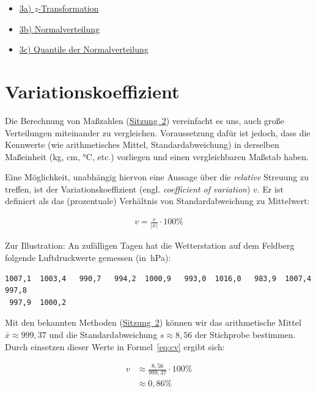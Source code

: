 \documentclass[
  11pt,
  ngerman,
  a4paper,
]{report}
\providecommand{\tightlist}{%
  \setlength{\itemsep}{0pt}\setlength{\parskip}{0pt}}
\begin{document}
\begin{itemize}
\tightlist
\item
  \href{https://video01.uni-frankfurt.de/Mediasite/Play/8c755eed883b4ea0924481da818b742f1d}{3a) \(z\)-Transformation}
\item
  \href{https://video01.uni-frankfurt.de/Mediasite/Play/26e839cc0d8d43d2a74c2c03b76aa6421d}{3b) Normalverteilung}
\item
  \href{https://video01.uni-frankfurt.de/Mediasite/Play/902e68deb21045a79473a249303558d11d}{3c) Quantile der Normalverteilung}
\end{itemize}

\hypertarget{variationskoeffizient}{%
\section{Variationskoeffizient}\label{variationskoeffizient}}

Die Berechnung von Maßzahlen (\protect\hyperlink{mauxdfzahlen}{Sitzung~2}) vereinfacht es uns, auch große Verteilungen miteinander zu vergleichen. Voraussetzung dafür ist jedoch, dass die Kennwerte (wie arithmetisches Mittel, Standardabweichung) in derselben Maßeinheit (kg, cm, °C, etc.) vorliegen und einen vergleichbaren Maßstab haben.

Eine Möglichkeit, unabhängig hiervon eine Aussage über die \emph{relative} Streuung zu treffen, ist der Variationskoeffizient (engl. \emph{coefficient of variation}) \(v\). Er ist definiert als das (prozentuale) Verhältnis von Standardabweichung zu Mittelwert:

\[\begin{aligned}
v=\frac{s}{|\bar{x}|}\cdot 100\%
\end{aligned}
\label{eq:cv}
\]

Zur Illustration: An zufälligen Tagen hat die Wetterstation auf dem Feldberg folgende Luftdruckwerte gemessen (in~hPa):

\begin{verbatim}
1007,1  1003,4   990,7   994,2  1000,9   993,0  1016,0   983,9  1007,4   997,8  
 997,9  1000,2
\end{verbatim}

Mit den bekannten Methoden (\protect\hyperlink{mauxdfzahlen}{Sitzung~2}) können wir das arithmetische Mittel \(\bar{x}\approx 999,37\) und die Standardabweichung \(s\approx8,56\) der Stichprobe bestimmen. Durch einsetzen dieser Werte in Formel~\eqref{eq:cv} ergibt sich:

\[\begin{aligned}
v&\approx\frac{8{,}56}{999{,}37}\cdot 100\%\\[4pt]
 &\approx0{,}86\%
\end{aligned}
\]
\end{document}
